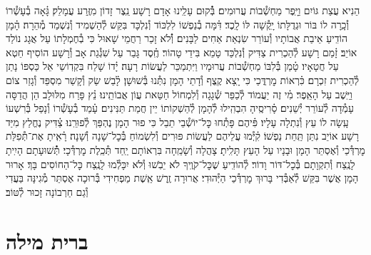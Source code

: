 \documentclass[twoside, openany, parskip=half, 11pt]{book}
\begin{document}
הֵנִיא עֲצַת גּוֹיִם וַיָּֽפֶר מַחְשְׁ֯בוֹת עֲרוּמִים׃ \hfill \break
בְּ֯֗קוּם עָלֵֽינוּ אָדָם רָשָׁע נֵֽצֶר זָדוֹן מִזֶּֽרַע עֲמָלֵק׃ \hfill \break
גָּ֗אָה בְ֯עָשְׁ֯רוֹ וְ֯כָֽרָה לוֹ בּוֹר וּגְדֻלָּתוֹ יָֽקְ֯שָׁה לּוֹ לָֽכֶד׃ \hfill \break
דִּ֗מָּה בְ֯נַפְשׁוֹ לִלְכּוֹד וְ֯נִלְכָּד בִּקֵּשׁ לְ֯הַשְׁמִיד וְ֯נִשְׁמַד מְ֯הֵרָה׃ \hfill \break
הָ֗מָן הוֹדִֽיעַ אֵיבַת אֲבוֹתָיו וְ֯עוֹרֵר שִׂנְאַת אַחִים לַבָּנִים׃ \hfill \break
וְ֯֗לֹא זָכַר רַחֲמֵי שָׁאוּל כִּי בְ֯חֶמְלָתוֹ עַל אֲגָג נוֹלַד אוֹיֵב׃ \hfill \break
זָ֗מַם רָשָׁע לְ֯הַכְרִית צַדִּיק וְ֯נִלְכַּד טָמֵא בִּידֵי טָהוֹר׃ \hfill \break
חֶֽ֗סֶד גָּבַר עַל שִׁגְ֯גַת אָב וְ֯רָשָׁע הוֹסִיף חֵטְא עַל חֲטָאָיו׃ \hfill \break
טָ֗מַן בְּ֯לִבּוֹ מַחְשְׁ֯בוֹת עֲרוּמָיו וַיִּתְמַכֵּר לַעֲשׂוֹת רָעָה׃ \hfill \break
יָ֗דוֹ שָׁלַח בִּקְדֽוֹשֵי אֵל כַּסְפּוֹ נָתַן לְ֯הַכְרִית זִכְרָם׃ \hfill \break
כִּ֗רְאוֹת מׇרְדֳּכַי כִּי יָֽצָא קֶֽצֶף וְ֯דָתֵי הָמָן נִתְּ֯נוּ בְּ֯שׁוּשָׁן׃ \hfill \break
לָ֗בַשׁ שַׂק וְ֯קָשַׁר מִסְפֵּד וְ֯גָזַר צוֹם וַיֵּֽשֶׁב עַל הָאֵֽפֶר׃ \hfill \break
מִ֗י זֶה יַעֲמוֹד לְ֯כַפֵּר שְׁ֯גָגָה וְ֯לִמְחוֹל חַטַּאת עֲוֹן אֲבוֹתֵֽינוּ׃ \hfill \break
נֵ֗ץ פָּרַח מִלּוּלָב הֵן הֲדַסָּה עָמְ֯דָה לְ֯עוֹרֵר יְ֯שֵׁנִים׃ \hfill \break
סָ֗רִיסֶֽיהָ הִבְהִֽילוּ לְ֯הָמָן לְ֯הַשְׁקוֹתוֹ יֵין חֲמַת תַּנִּינִים׃ \hfill \break
עָ֗מַד בְ֯עָשְׁ֯רוֹ וְ֯נָפַל בְּ֯רִשְׁעוֹ עָֽשָׂה לוֹ עֵץ וְ֯נִתְלָה עָלָיו׃ \hfill \break
פִּ֗יהֶם פָּתְ֯חוּ כׇּל־יוֹשְׁ֯בֵי תֵבֵל כִּי פוּר הָמָן נֶהְפַּךְ לְ֯פוּרֵֽנוּ׃ \hfill \break
צַ֗דִּיק נֶחֱלַץ מִיַּד רָשָׁע אוֹיֵב נִתַּן תַּֽחַת נַפְשׁוֹ׃ \hfill \break
קִ֗יְּ֯מוּ עֲלֵיהֶם לַעֲשׂוֹת פּוּרִים וְ֯לִשְׂמוֹחַ בְּ֯כׇל־שָׁנָה וְ֯שָׁנָה׃ \hfill \break
רָ֗אִֽיתָ אֶת־תְּ֯פִלַּת מׇרְדְּ֯כַי וְ֯אֶסְתֵּר הָמָן וּבָנָיו עַל הָעֵץ תָּלִֽיתָ׃ \hfill \break
{}
צָהֲלָה וְ֯שָׂמֵֽחָה בִּרְאוֹתָם יַֽחַד תְּ֯כֵֽלֶת מׇרְדְּ֯כָי׃ \hfill \break
תְּ֯֗שׁוּעָתָם הָיִֽיתָ לָנֶֽצַח וְ֯תִקְוָתָם בְּ֯כׇל־דּוֹר וָדוֹר׃ \hfill \break
לְ֯הוֹדִֽיעַ שֶׁכׇּל־קֹוֶֽיךָ לֹא יֵבֹֽשׁוּ וְ֯לֹא יִכָּלְ֯מוּ לָנֶֽצַח כׇּל־הַחוֹסִים בָּךְ׃ \hfill \break
אָרוּר הָמָן אֲשֶׁר בִּקֵּשׁ לְ֯אַבְּ֯דִי בָּרוּךְ מׇרְדְּ֯כַי הַיְּ֯הוּדִי׃ \hfill \break
אֲרוּרָה זֶֽרֶשׁ אֵֽשֶׁת מַפְחִידִי בְּ֯רוּכָה אֶסְתֵּר מְ֯גִינָּה בַּעֲדִי וְ֯גַם חַרְבוֹנָה זָכוּר לְ֯טּוֹב׃

\vfill


\sepline



\chapter[ברית מילה]{ ברית מילה }
\end{document}
